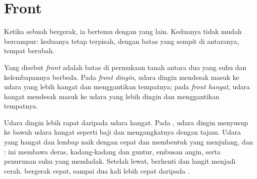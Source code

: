 \section{Front}

Ketika sebuah  bergerak, ia bertemu dengan  yang
lain. Keduanya tidak mudah bercampur: keduanya tetap terpisah, dengan
batas yang sempit di antaranya, tempat  berubah.

\begin{definition}[Front]\label{def:g8:fronts-and-weather-maps:front}
Yang disebut \emph{front} adalah batas di permukaan tanah
antara dua  yang suhu dan kelembapannya berbeda. Pada
\emph{front dingin}, udara dingin mendesak masuk ke
udara yang lebih hangat dan menggantikan tempatnya; pada \emph{front
hangat}, udara hangat mendesak masuk ke udara yang
lebih dingin dan menggantikan tempatnya.
\end{definition}

Udara dingin lebih rapat daripada udara hangat. Pada , udara
dingin menyusup ke bawah udara hangat seperti baji dan mengangkatnya
dengan tajam. Udara yang hangat dan lembap naik dengan cepat dan membentuk
 yang menjulang,  dan :  ini membawa 
deras, kadang-kadang  dan guntur, embusan angin, serta penurunan
suhu yang mendadak. Setelah  lewat,  berhenti dan langit menjadi
cerah.  bergerak cepat, sampai dua kali lebih cepat daripada
.

